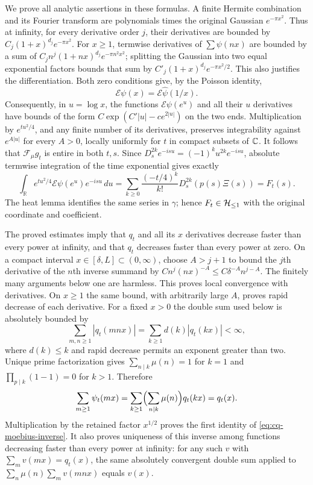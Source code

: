 We prove all analytic assertions in these formulas. A finite Hermite
combination and its Fourier transform are polynomials times the
original Gaussian $e^{-\pi x^2}$. Thus at infinity, for every
derivative order $j$, their derivatives are bounded by
$C_j(1+x)^{d_j}e^{-\pi x^2}$. For $x\geq1$, termwise derivatives
of $\sum\psi(nx)$ are bounded by a sum of
$C_j n^j(1+nx)^{d_j}e^{-\pi n^2x^2}$; splitting the Gaussian
into two equal exponential factors bounds that sum by
$C'_j(1+x)^{d_j}e^{-\pi x^2/2}$. This also justifies the
differentiation. Both zero conditions give, by the Poisson identity,
\[
 \mathcal E\psi(x)=\mathcal E\widehat\psi(1/x).
\]
Consequently, in $u=\log x$, the functions
$\mathcal E\psi(e^u)$ and all their $u$ derivatives have bounds
of the form $C\exp(C'|u|-c e^{2|u|})$ on the two ends.
Multiplication by $e^{tu^2/4}$, and any finite number of its
derivatives, preserves integrability against $e^{A|u|}$ for every
$A>0$, locally uniformly for $t$ in compact subsets of $\mathbb C$.
It follows that $\mathcal F_\mu g_t$ is entire in both $t,s$.
Since $D_s^{2k}e^{-isu}=(-1)^ku^{2k}e^{-isu}$, absolute
termwise integration of the time exponential gives exactly
\[
 \int_{\mathbb R}e^{tu^2/4}\mathcal E\psi(e^u)e^{-isu}\,du
 =\sum_{k\geq0}\frac{(-t/4)^k}{k!}
       D_s^{2k}(p(s)\Xi(s))=F_t(s).
\]
The heat lemma identifies the same series in $\gamma$; hence
$F_t\in\mathcal H_{\leq 1}$ with the original coordinate and coefficient.

The proved estimates imply that $q_t$ and all its $x$ derivatives
decrease faster than every power at infinity, and that $q_t$
decreases faster than every power at zero. On a compact interval
$x\in[\delta,L]\subset(0,\infty)$, choose $A>j+1$ to bound
the $j$th derivative of the $n$th inverse summand by
$C n^j(nx)^{-A}\leq C\delta^{-A}n^{j-A}$.
The finitely many arguments below one are harmless. This proves
local convergence with derivatives. On $x\geq1$ the same bound,
with arbitrarily large $A$, proves rapid decrease of each derivative.
For a fixed $x>0$ the double sum used below is absolutely bounded by
\[
 \sum_{m,n\geq1}|q_t(mnx)|
 =\sum_{k\geq1}d(k)|q_t(kx)|<\infty,
\]
where $d(k)\leq k$ and rapid decrease permits an exponent greater
than two. Unique prime factorization gives
$\sum_{n\mid k}\mu(n)=1$ for $k=1$ and
$\prod_{p\mid k}(1-1)=0$ for $k>1$. Therefore
\[
 \sum_{m\geq1}\psi_t(mx)
 =\sum_{k\geq1}\Bigl(\sum_{n\mid k}\mu(n)\Bigr)q_t(kx)
 =q_t(x).
\]
Multiplication by the retained factor $x^{1/2}$ proves the first
identity of \eqref{eq:cq-moebius-inverse}. It also proves uniqueness
of this inverse among functions decreasing faster than every power
at infinity: for any such $v$ with $\sum_m v(mx)=q_t(x)$, the
same absolutely convergent double sum applied to
$\sum_n\mu(n)\sum_m v(mnx)$ equals $v(x)$.

